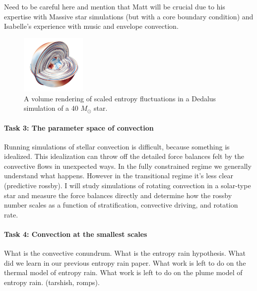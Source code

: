 \documentclass[12pt]{article}
\begin{document}
Need to be careful here and mention that Matt will be crucial due to his expertise with Massive star simulations (but with a core boundary condition) and Isabelle's experience with music and envelope convection.

\begin{figure}
	\begin{center}
	\vspace{-10pt}
    \includegraphics[width=0.28\textwidth]{./figs/massive_star.png}
	\vspace{-16pt}
	\end{center}
    \caption{ A volume rendering of scaled entropy fluctuations in a Dedalus simulation of a 40 $M_\odot$ star.
	\label{fig:massive_star} }
\end{figure}



\paragraph*{Task 3: The parameter space of convection}
Running simulations of stellar convection is difficult, because something is idealized.
This idealization can throw off the detailed force balances felt by the convective flows in unexpected ways.
In the fully constrained regime we generally understand what happens.
However in the transitional regime it's less clear (predictive rossby).
I will study simulations of rotating convection in a solar-type star and measure the force balances directly and determine how the rossby number scales as a function of stratification, convective driving, and rotation rate.


\paragraph*{Task 4: Convection at the smallest scales}
What is the convective conundrum.
What is the entropy rain hypothesis.
What did we learn in our previous entropy rain paper.
What work is left to do on the thermal model of entropy rain.
What work is left to do on the plume model of entropy rain. (tarshish, romps).
\end{document}
